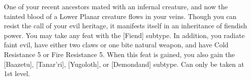  {}
\shortfeatspl
{One of your recent ancestors mated with an infernal creature, and now the tainted blood of a Lower Planar creature flows in your veins. Though you can resist the call of your evil heritage, it manifests itself in an inheritance of fiendish power.}
{You may take any feat with the [Fiend] subtype. In addition, you radiate faint evil, have either two claws or one bite natural weapon, and have Cold Resistance 5 or Fire Resistance 5. When this feat is gained, you also gain the [Baazetu], [Tanar'ri], [Yugoloth], or [Demondand] subtype.}
{Can only be taken at 1st level.}